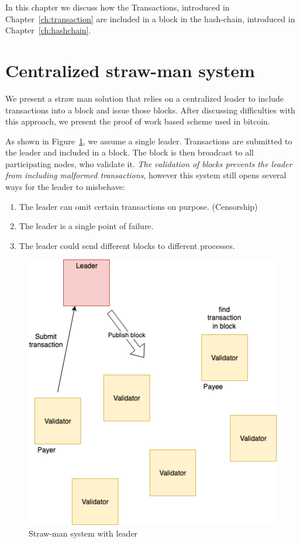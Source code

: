 
In this chapter we discuss how the Transactions, introduced in 
Chapter~\ref{ch:transaction} are included in a block in the hash-chain,
introduced in Chapter~\ref{ch:hashchain}.

\section{Centralized straw-man system}
We present a straw man solution that relies on a centralized leader to include transactions into a block and issue those blocks. 
After discussing difficulties with this approach, we present the proof of work based scheme used in bitcoin.

As shown in Figure~\ref{fig:leader}, we assume a single leader. Transactions are submitted to the leader and included in a block.
The block is then broadcast to all participating nodes, who validate it.
\emph{The validation of blocks prevents the leader from including malformed transactions}, however this system still opens several ways for the leader to misbehave:
\begin{enumerate}[label=\Alph*)]
	\item The leader can omit certain transactions on purpose. (Censorship)
	\item The leader is a single point of failure.
	\item The leader could send different blocks to different processes.
\end{enumerate}

\begin{figure}
	\includegraphics{fig/Leader}
	\caption{Straw-man system with leader}
	\label{fig:leader}
\end{figure}

